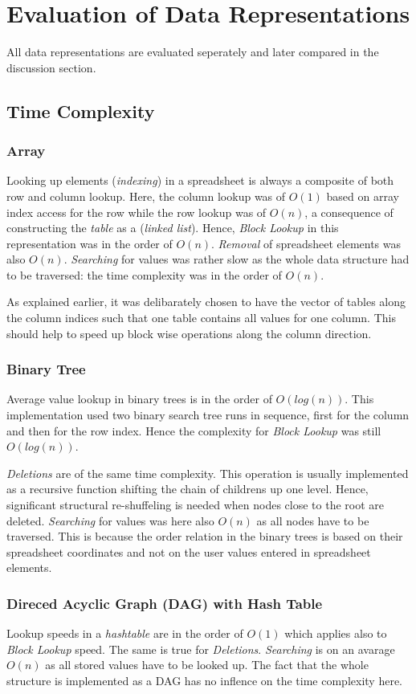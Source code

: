 \documentclass[a4paper,11pt,twoside]{article}
\begin{document}
\section{Evaluation of Data Representations}
All data representations are evaluated seperately and later compared
in the discussion section.
\subsection{Time Complexity}
\subsubsection{Array}
Looking up elements (\textit{indexing}) in a spreadsheet is always a
composite of both row and column lookup. Here, the column lookup was of
$O(1)$ based on array index access for the row while the row lookup was
of $O(n)$, a consequence of constructing the \textit{table} as a
(\textit{linked list}). Hence, \emph{Block Lookup} in this representation 
was in the order of $O(n)$. \emph{Removal} of spreadsheet elements was
also $O(n)$. \emph{Searching} for values was rather slow as the whole
data structure had to be traversed: the time complexity was in the
order of $O(n)$.

As explained earlier, it was delibarately chosen to have the vector of tables
along the column indices such that one table contains all values for
one column. This should help to speed up block wise operations along
the column direction.

\subsubsection{Binary Tree}
Average value lookup in binary trees is in the order of
$O(log(n))$. This implementation used two binary search tree runs in
sequence, first for the column and then for the row index. Hence the
complexity for \emph{Block Lookup} was still $O(log(n))$.

\emph{Deletions} are of the same time complexity. This operation is
usually implemented as a recursive function shifting the chain of
childrens up one level. Hence, significant structural re-shuffeling is
needed when nodes close to the root are deleted.  
\emph{Searching} for values was here also $O(n)$ as all
nodes have to be traversed. This is because the order relation in the
binary trees is based on their spreadsheet coordinates and not on the user
values entered in spreadsheet elements.


\subsubsection{Direced Acyclic Graph (DAG) with Hash Table}
Lookup speeds in a \textit{hashtable} are in the order of $O(1)$ which
applies also to \emph{Block Lookup} speed. The same is true for
\emph{Deletions}. \emph{Searching} is on an avarage $O(n)$ as all stored values
have to be looked up. The fact that the whole structure is implemented as a DAG has
no inflence on the time complexity here. 
\end{document}
